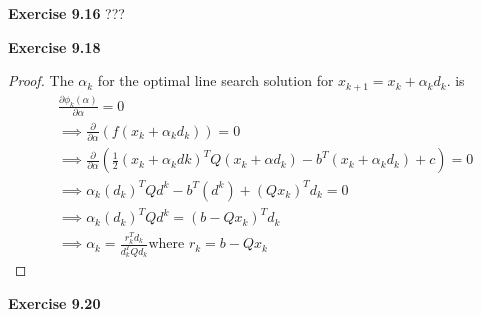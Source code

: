 \documentclass[letterpaper,12pt]{article}
\theoremstyle{definition}
\begin{document}
\noindent\textbf{Exercise 9.16}
???

\noindent\textbf{Exercise 9.18}
\begin{proof}
	The $\alpha_k$ for the optimal line search solution for $x_{k+1} = x_k + \alpha_k d_k$.  is 
	\begin{align*}
		&\frac{\partial \phi_k(\alpha)}{\partial \alpha} = 0\\
		&\implies \frac{\partial }{\partial \alpha} (f(x_k + \alpha_kd_k)) = 0\\
		&\implies \frac{\partial }{\partial \alpha} (\frac{1}{2}(x_k + \alpha_kdk)^TQ(x_k + \alpha d_k) - b^T(x_k+\alpha_kd_k) + c) = 0 \\
		& \implies \alpha_k(d_k)^TQd^k - b^T(d^k) + (Qx_k)^Td_k = 0 \\
		& \implies \alpha_k(d_k)^TQd^k = (b - Qx_k)^Td_k \\
		& \implies \alpha_k = \frac{r_k^Td_k}{d^T_kQd_k} \text{where }r_k = b - Qx_k
	\end{align*}
\end{proof}


\noindent\textbf{Exercise 9.20}
\end{document}

